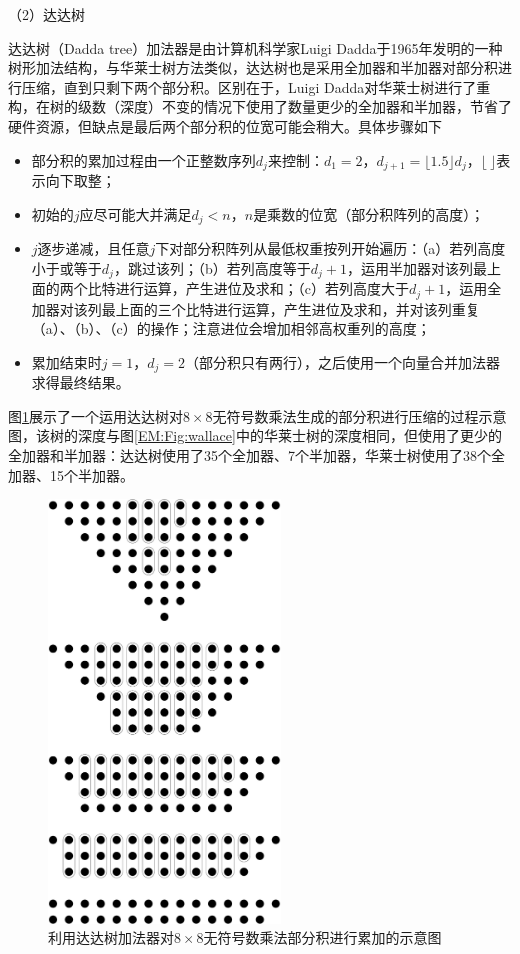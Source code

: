 （2）达达树

达达树（Dadda tree）加法器是由计算机科学家Luigi Dadda于1965年发明的一种树形加法结构\cite{EM:Dadda}，与华莱士树方法类似，达达树也是采用全加器和半加器对部分积进行压缩，直到只剩下两个部分积。区别在于，Luigi Dadda对华莱士树进行了重构，在树的级数（深度）不变的情况下使用了数量更少的全加器和半加器，节省了硬件资源，但缺点是最后两个部分积的位宽可能会稍大。具体步骤如下%
\begin{itemize}
    \item 部分积的累加过程由一个正整数序列$d_j$来控制：$d_1=2$，$d_{j+1}=\lfloor 1.5 \rfloor d_j$，$\lfloor \ \rfloor$表示向下取整；
    \item 初始的$j$应尽可能大并满足$d_j < n$，$n$是乘数的位宽（部分积阵列的高度）；
    \item $j$逐步递减，且任意$j$下对部分积阵列从最低权重按列开始遍历：（a）若列高度小于或等于$d_j$，跳过该列；（b）若列高度等于$d_j+1$，运用半加器对该列最上面的两个比特进行运算，产生进位及求和；（c）若列高度大于$d_j+1$，运用全加器对该列最上面的三个比特进行运算，产生进位及求和，并对该列重复（a）、（b）、（c）的操作；注意进位会增加相邻高权重列的高度；
    \item 累加结束时$j=1$，$d_j=2$（部分积只有两行），之后使用一个向量合并加法器求得最终结果。
\end{itemize}

图\ref{EM:Fig:dadda}展示了一个运用达达树对$8 \times 8$无符号数乘法生成的部分积进行压缩的过程示意图，该树的深度与图\ref{EM:Fig:wallace}中的华莱士树的深度相同，但使用了更少的全加器和半加器：达达树使用了35个全加器、7个半加器，华莱士树使用了38个全加器、15个半加器。
\begin{figure}[!htb]
    \centering
    \includegraphics[width=0.55\textwidth]{figs/EM-dadda.pdf}
    \caption{利用达达树加法器对$8 \times 8$无符号数乘法部分积进行累加的示意图}
    \label{EM:Fig:dadda}
\end{figure}

